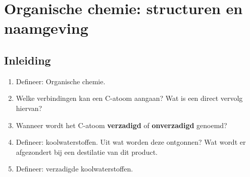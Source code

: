\documentclass[a4paper,12pt]{article}
\begin{document}
    \maketitle

    \section{Organische chemie: structuren en naamgeving}
    \subsection*{Inleiding}
    \begin{enumerate}
        \item Defineer: Organische chemie.
        \item Welke verbindingen kan een C-atoom aangaan? Wat is een direct vervolg hiervan? 
        \item Wanneer wordt het C-atoom \textbf{verzadigd} of \textbf{onverzadigd} genoemd?
        \item Defineer: koolwaterstoffen. Uit wat worden deze ontgonnen? Wat wordt er afgezondert bij een destilatie van dit product.
        \item Defineer: verzadigde koolwaterstoffen.
    \end{enumerate}
\end{document}

